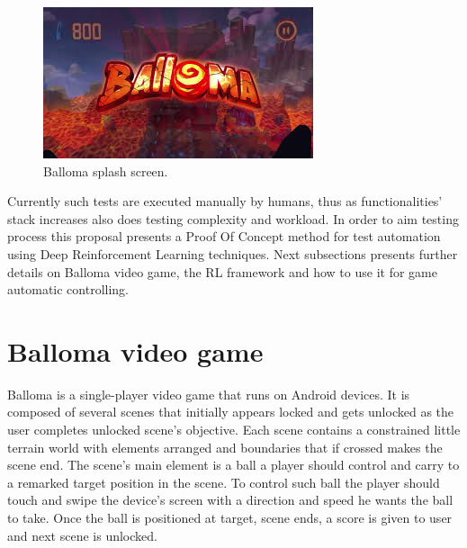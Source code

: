 \documentclass[peerreview]{IEEEtran}
\begin{document}
%
%
\begin{figure}[!h]
\centering
\includegraphics[width=0.8\columnwidth]{img/balloma_cover.jpeg} 
\caption{Balloma splash screen.}
\label{fig_sim}
\end{figure}

Currently such tests are executed manually by humans, thus as functionalities' stack increases also does testing complexity and workload. In order to aim testing process this proposal presents a Proof Of Concept method for test automation using Deep Reinforcement Learning techniques. Next subsections presents further details on Balloma video game, the RL framework and how to use it for game automatic controlling.


\section{Balloma video game}
  
   Balloma is a single-player video game that runs on Android devices. It is composed of several scenes that initially appears locked and gets unlocked as the user completes unlocked scene's objective. Each scene contains a constrained little terrain world with elements arranged and boundaries that if crossed makes the scene end. The scene's main element is a ball a player should control and carry to a remarked target position in the scene. To control such ball the player should touch and swipe the device's screen with a direction and speed he wants the ball to take.  Once the ball is positioned at target, scene ends, a score is given to user and next scene is unlocked. 
   
\end{document}
